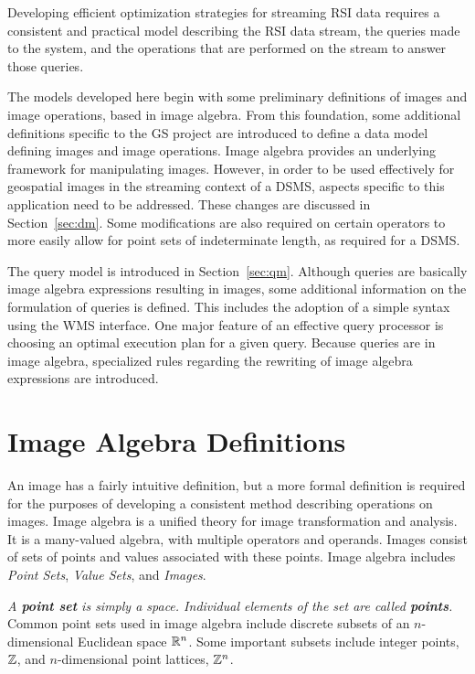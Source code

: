 \documentclass{ucdthesis}       %
\begin{document}
Developing efficient optimization strategies for streaming \ac{RSI}
data requires a consistent and practical model describing the \ac{RSI}
data stream, the queries made to the system, and the operations that
are performed on the stream to answer those queries.

The models developed here begin with some preliminary definitions of
images and image operations, based in image algebra.  From this
foundation, some additional definitions specific to the \ac{GS}
project are introduced to define a data model defining images and
image operations.  Image algebra provides an underlying framework for
manipulating images.  However, in order to be used effectively for
geospatial images in the streaming context of a \ac{DSMS}, aspects
specific to this application need to be addressed.  These changes are
discussed in Section~\ref{sec:dm}.  Some modifications are also
required on certain operators to more easily allow for point sets of
indeterminate length, as required for a \ac{DSMS}.

The query model is introduced in Section~\ref{sec:qm}.  Although
queries are basically image algebra expressions resulting in images,
some additional information on the formulation of queries is defined.
This includes the adoption of a simple syntax using the \acf{WMS}
interface.  One major feature of an effective query processor is
choosing an optimal execution plan for a given query.  Because queries
are in image algebra, specialized rules regarding the rewriting of
image algebra expressions are introduced.

\section{Image Algebra Definitions}
\label{sec:image-algebra}

An image has a fairly intuitive definition, but a more formal
definition is required for the purposes of developing a consistent
method describing operations on images.  Image algebra is a unified
theory for image transformation and analysis.  It is a many-valued
algebra, with multiple operators and operands.  Images consist of sets
of points and values associated with these points.  Image
algebra includes \emph{Point Sets}, \emph{Value Sets}, and
\emph{Images}.

\emph{A {\bf point set} is simply a space.  Individual elements of the
  set are called {\bf points}.}  Common point sets used in image
algebra include discrete subsets of an $n$-dimensional Euclidean space
${\mathbb{R}}^n$.  Some important subsets include integer points, ${\mathbb{Z}}$,
and $n$-dimensional point lattices, ${\mathbb{Z}}^n$.
\end{document}
